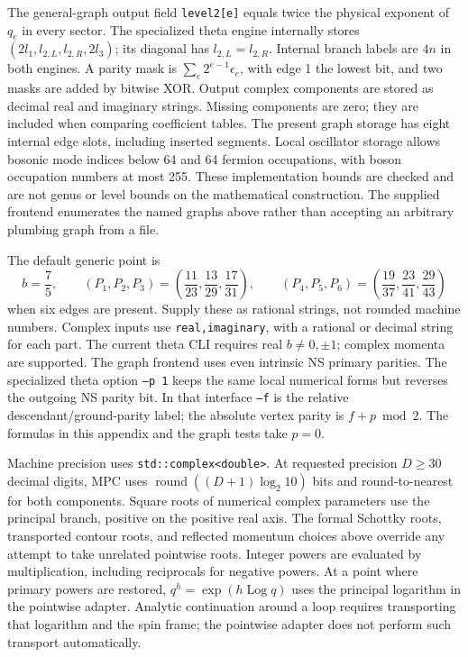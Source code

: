 The general-graph output field \texttt{level2[e]} equals twice the
physical exponent of $q_e$ in every sector. The specialized theta
engine internally stores $(2l_1,l_{2,L},l_{2,R},2l_3)$; its diagonal
has $l_{2,L}=l_{2,R}$. Internal branch labels are $4n$ in both engines.
A parity mask is $\sum_e2^{e-1}\epsilon_e$, with edge 1 the lowest
bit, and two masks are added by bitwise XOR. Output complex components
are stored as decimal real and imaginary strings. Missing components
are zero; they are included when comparing coefficient tables.
The present graph storage has eight internal edge slots, including
inserted segments. Local oscillator storage allows bosonic mode indices
below 64 and 64 fermion occupations, with boson occupation numbers at most
255. These implementation bounds are checked and are not genus or
level bounds on the mathematical construction. The supplied frontend
enumerates the named graphs above rather than accepting an arbitrary
plumbing graph from a file.

The default generic point is
\begin{equation}
 b=\frac75,\qquad
 (P_1,P_2,P_3)=\left(\frac{11}{23},\frac{13}{29},\frac{17}{31}\right),
 \qquad
 (P_4,P_5,P_6)=\left(\frac{19}{37},\frac{23}{41},\frac{29}{43}\right)
 \label{eq:app-test-parameters}
\end{equation}
when six edges are present. Supply these as rational strings, not
rounded machine numbers. Complex inputs use \texttt{real,imaginary},
with a rational or decimal string for each part. The current theta CLI
requires real $b\ne0,\pm1$; complex momenta are supported.
The graph frontend uses even intrinsic NS primary parities. The
specialized theta option \texttt{--p 1} keeps the same local numerical
forms but reverses the outgoing NS parity bit. In that interface
\texttt{--f} is the relative descendant/ground-parity label; the
absolute vertex parity is $f+p\bmod2$. The formulas in this appendix
and the graph tests take $p=0$.

Machine precision uses \texttt{std::complex<double>}. At requested
precision $D\ge30$ decimal digits, MPC uses
$\operatorname{round}((D+1)\log_2 10)$ bits and round-to-nearest
for both components. Square roots of numerical complex parameters use
the principal branch, positive on the positive real axis. The formal
Schottky roots, transported contour roots, and reflected momentum
choices above override any attempt to take unrelated pointwise roots.
Integer powers are evaluated by multiplication, including reciprocals
for negative powers. At a point where primary powers are restored,
$q^h=\exp(h\operatorname{Log}q)$ uses the principal logarithm in the
pointwise adapter. Analytic continuation around a loop requires
transporting that logarithm and the spin frame; the pointwise adapter
does not perform such transport automatically.

